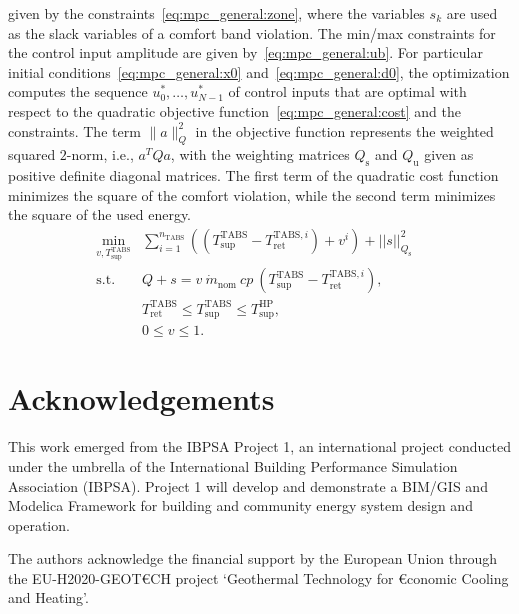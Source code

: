 \documentclass[10pt]{extarticle}
\newcommand{\lrp}[1]{\ensuremath{\left( #1 \right)}}
\newcommand{\QQ}[1]{Q_{\text{#1}}}
\begin{document}
given by the constraints~\eqref{eq:mpc_general:zone},
where the variables $s_k$ are used as the slack variables of a comfort band violation.
The min/max constraints for the control input amplitude are given by~\eqref{eq:mpc_general:ub}.
For particular initial conditions~\eqref{eq:mpc_general:x0} and~\eqref{eq:mpc_general:d0}, 
 the optimization computes the sequence $u_0^*, \ldots, u_{N-1}^*$ of control inputs that
are optimal with respect to the quadratic objective function~\eqref{eq:mpc_general:cost}
and the constraints.
The term $\|a\|_Q^2$ in the objective function represents the weighted squared $2$-norm, i.e., $a^T Q a$,
with the weighting matrices $Q_\text{s}$ and $Q_\text{u}$ given as positive 
definite diagonal matrices.
The first term of the quadratic cost function minimizes the square of the comfort violation,
while the second term minimizes the square of the used energy.
% 
\begin{subequations}
\label{eq:NLP_postprocess}
\begin{align}
 \min_{v, T_{\text{sup}}^{\text{TABS}}} & \sum_{i=1}^{n_{\text{TABS}}} \lrp{(T_{\text{sup}}^{\text{TABS}} - T_{\text{ret}}^{\text{TABS},i}) + v^i } + || s ||_{\QQ{s}}^2  &
 \label{eq:NLP_postprocess:cost}\\
  \text{s.t.} \ & Q + s = v \ \dot{m}_{\text{nom}} \ cp \ (T_{\text{sup}}^{\text{TABS}} -  T_{\text{ret}}^{\text{TABS},i}), &  \label{eq:NLP_postprocess:heat_equation} \\
   &  T_{\text{ret}}^{\text{TABS}} \le T_{\text{sup}}^{\text{TABS}} \le T_{\text{sup}}^{\text{HP}}, \label{eq:NLP_postprocess:tsup_minmax}\\
    & 0 \le v \le 1.   \label{eq:NLP_postprocess:valve_minmax}
\end{align}
\end{subequations}




\section*{Acknowledgements}

This work emerged from the IBPSA Project 1, an international project conducted under the umbrella of the International Building Performance Simulation Association (IBPSA). Project 1 will develop and demonstrate a BIM/GIS and Modelica Framework for building and community energy system design and operation.

The authors acknowledge the financial support by the European Union through  the EU-H2020-GEOT\euro CH 
project ‘Geothermal Technology for \euro conomic Cooling and Heating’.
\end{document}
